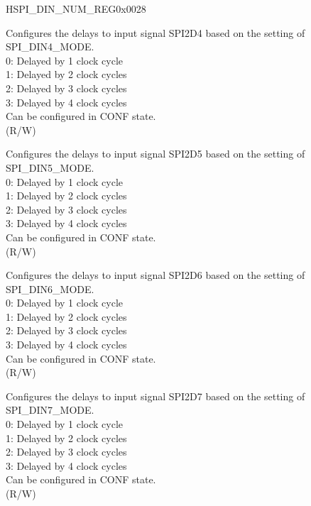 \addtocounter{Regfloat}{-1}
\begin{register}{H}{SPI\_DIN\_NUM\_REG}{0x0028}
\begin{regdesc}\begin{reglist}
\item [Continued from the previous page...]
\label{fielddesc:SPIDIN4NUM}\item [SPI\_DIN4\_NUM] Configures the delays to input signal SPI2D4 based on the setting of SPI\_DIN4\_MODE.\\
0: Delayed by 1 clock cycle\\
1: Delayed by 2 clock cycles\\
2: Delayed by 3 clock cycles\\
3: Delayed by 4 clock cycles\\
Can be configured in CONF state. \\
(R/W)
\label{fielddesc:SPIDIN5NUM}\item [SPI\_DIN5\_NUM] Configures the delays to input signal SPI2D5 based on the setting of SPI\_DIN5\_MODE.\\
0: Delayed by 1 clock cycle\\
1: Delayed by 2 clock cycles\\
2: Delayed by 3 clock cycles\\
3: Delayed by 4 clock cycles\\
Can be configured in CONF state.\\
(R/W)
\label{fielddesc:SPIDIN6NUM}\item [SPI\_DIN6\_NUM] Configures the delays to input signal SPI2D6 based on the setting of SPI\_DIN6\_MODE.\\
0: Delayed by 1 clock cycle\\
1: Delayed by 2 clock cycles\\
2: Delayed by 3 clock cycles\\
3: Delayed by 4 clock cycles\\
Can be configured in CONF state.\\
(R/W)
\label{fielddesc:SPIDIN7NUM}\item [SPI\_DIN7\_NUM] Configures the delays to input signal SPI2D7 based on the setting of SPI\_DIN7\_MODE.\\
0: Delayed by 1 clock cycle\\
1: Delayed by 2 clock cycles\\
2: Delayed by 3 clock cycles\\
3: Delayed by 4 clock cycles\\
Can be configured in CONF state.\\
(R/W)
\end{reglist}\end{regdesc}
\end{register}


